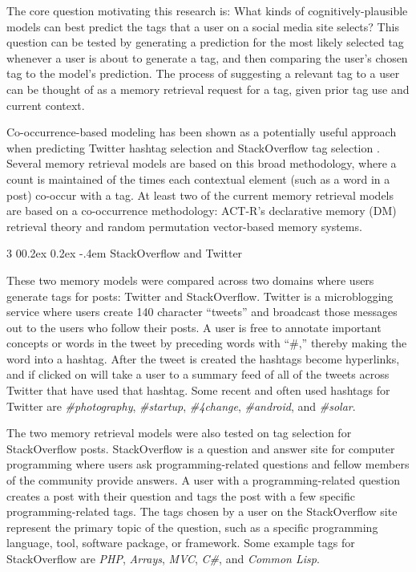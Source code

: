 \documentclass[man,floatsintext,donotrepeattitle]{apa6}
\makeatletter
\renewcommand{\subsubsection}{%
  \@startsection
  {subsubsection}%
  {3}%
  {\parindent}%
  {0\baselineskip \@plus 0.2ex \@minus 0.2ex}%
  {-.4em}%
  {\normalfont\normalsize\bfseries\addperi}}
\makeatother
\begin{document}
The core question motivating this research is:
What kinds of cognitively-plausible models can best predict the tags that a user on a social media site selects?
This question can be tested by generating a prediction for the most likely selected tag whenever a user is about to generate a tag, and then comparing the user's chosen tag to the model's prediction.
The process of suggesting a relevant tag to a user can be thought of as a memory retrieval request for a tag, given prior tag use and current context.

Co-occurrence-based modeling has been shown as a potentially useful approach when predicting Twitter hashtag selection \parencite{Efron2010} and StackOverflow tag selection \parencites{Stanley2013}.
Several memory retrieval models are based on this broad methodology, where a count is maintained of the times each contextual element (such as a word in a post) co-occur with a tag.
At least two of the current memory retrieval models are based on a co-occurrence methodology:
ACT-R's declarative memory (DM) retrieval theory and random permutation vector-based memory systems.

\subsubsection{StackOverflow and Twitter}

These two memory models were compared across two domains where users generate tags for posts: Twitter and StackOverflow.
Twitter is a microblogging service where users create 140 character ``tweets'' and broadcast those messages out to the users who follow their posts.
A user is free to annotate important concepts or words in the tweet by preceding words with ``\#,'' thereby making the word into a hashtag.
After the tweet is created the hashtags become hyperlinks, and if clicked on will take a user to a summary feed of all of the tweets across Twitter that have used that hashtag.
Some recent and often used hashtags for Twitter are \emph{\#photography}, \emph{\#startup}, \emph{\#4change}, \emph{\#android}, and \emph{\#solar}.

The two memory retrieval models were also tested on tag selection for StackOverflow posts.
StackOverflow is a question and answer site for computer programming where users ask programming-related questions and fellow members of the community provide answers.
A user with a programming-related question creates a post with their question and tags the post with a few specific programming-related tags. 
The tags chosen by a user on the StackOverflow site represent the primary topic of the question, such as a specific programming language, tool, software package, or framework.
Some example tags for StackOverflow are \emph{PHP}, \emph{Arrays}, \emph{MVC}, \emph{C\#}, and \emph{Common Lisp}.
\end{document}
